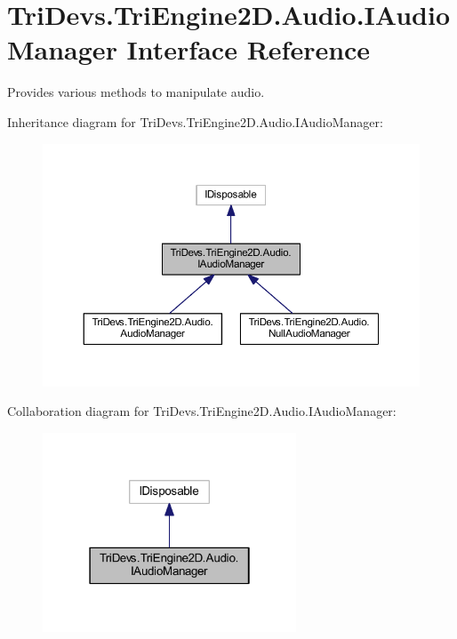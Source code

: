 \hypertarget{interface_tri_devs_1_1_tri_engine2_d_1_1_audio_1_1_i_audio_manager}{\section{Tri\-Devs.\-Tri\-Engine2\-D.\-Audio.\-I\-Audio\-Manager Interface Reference}
\label{interface_tri_devs_1_1_tri_engine2_d_1_1_audio_1_1_i_audio_manager}
}


Provides various methods to manipulate audio.  




Inheritance diagram for Tri\-Devs.\-Tri\-Engine2\-D.\-Audio.\-I\-Audio\-Manager\-:
\nopagebreak
\begin{figure}[H]
\begin{center}
\leavevmode
\includegraphics[width=350pt]{interface_tri_devs_1_1_tri_engine2_d_1_1_audio_1_1_i_audio_manager__inherit__graph}
\end{center}
\end{figure}


Collaboration diagram for Tri\-Devs.\-Tri\-Engine2\-D.\-Audio.\-I\-Audio\-Manager\-:
\nopagebreak
\begin{figure}[H]
\begin{center}
\leavevmode
\includegraphics[width=214pt]{interface_tri_devs_1_1_tri_engine2_d_1_1_audio_1_1_i_audio_manager__coll__graph}
\end{center}
\end{figure}
